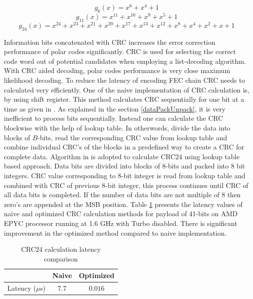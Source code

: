 \begin{equation} \label{crc_polynomial6}
g_{6}(x) = x^{6} + x^{4} + 1
\end{equation}
\begin{equation} \label{crc_polynomial11}
g_{11}(x) = x^{11} + x^{10} + x^{9} + x^{5} + 1
\end{equation}
\begin{equation} \label{crc_polynomial24}
g_{24}(x) = x^{24} + x^{23} + x^{21} + x^{20} + x^{17} + x^{13} + x^{12} + x^{8} + x^{4} + x^{2} + x + 1
\end{equation}

Information bits concatenated with CRC increases the error correction performance of polar codes significantly. CRC is used for selecting the correct code word out of potential candidates when employing a list-decoding algorithm. With CRC aided decoding, polar codes performance is very close maximum likelihood decoding. To reduce the latency of encoding FEC chain CRC needs to calculated very efficiently. One of the naive implementation of CRC calculation is, by using shift register. This method calculates CRC sequentially for one bit at a time as given in \cite{naiveCRCCalculation}. As explained in the section \ref{dataPackUnpack}, it is very inefficient to process bits sequentially. Instead one can calculate the CRC blockwise with the help of lookup table. In otherwords, divide the data into blocks of $B$-bits, read the corresponding CRC value from lookup table and combine individual CRC's of the blocks in a predefined way to create a CRC for complete data. Algorithm in \cite{Sarwate:1988:CCR:63030.63037} is adopted to calculate CRC24 using lookup table based approach. Data bits are divided into blocks of 8-bits and packed into 8 bit integers. CRC value corresponding to 8-bit integer is read from lookup table and combined with CRC of previous 8-bit integer, this process continues until CRC of all data bits is completed. If the number of data bits are not multiple of 8 then zero's are appended at the MSB position.  Table \ref{tab:crcLatencyTable} presents the latency values of naive and optimized  CRC calculation methods for payload of 41-bits on AMD EPYC processor running at 1.6 GHz with Turbo disabled. There is significant improvement in the optimized method compared to naive implementation.

\begin{table}[h!]
	\begin{center}
		\caption{CRC24 calculation latency comparison}
		\label{tab:crcLatencyTable}
		\begin{tabular}{c|c|c} %
			\textbf{ } & Naive & Optimized \\
			\hline
			Latency ($\mu$s) & $7.7$ & $0.016$\\
		\end{tabular}
	\end{center}
\end{table}

